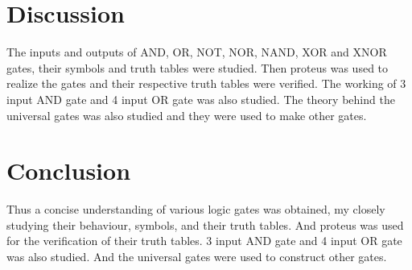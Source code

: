 \documentclass[a4paper, 12pt]{article}
\begin{document}
\pagebreak
\section{Discussion}
The inputs and outputs of AND, OR, NOT, NOR, NAND, XOR and XNOR gates, their symbols and truth tables were studied. Then proteus was used to realize the gates and their respective truth tables were verified. The working of 3 input AND gate and 4 input OR gate was also studied. The theory behind the universal gates was also studied and they were used to make other gates. 


\section{Conclusion}
Thus a concise understanding of various logic gates was obtained, my closely studying their behaviour, symbols, and their truth tables. And proteus was used for the verification of their truth tables. 3 input AND gate and 4 input OR gate was also studied. And the universal gates were used to construct other gates.
\end{document}
